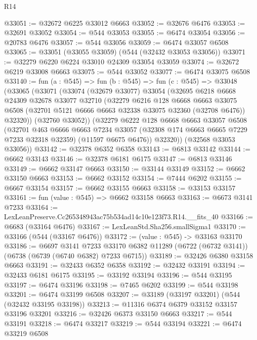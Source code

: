 \begin{lexlean}{R14}
\begin{coremodule}
@33051 := @32672 @6225 @33012 @6663
@33052 := @32676 @6476
@33053 := @32691 @33052
@33054 := @544 @33053
@33055 := @6474 @33054
@33056 := @20783 @6476
@33057 := @544 @33056
@33059 := @6474 @33057 @6508
@33065 := @33051 (@33055 @33059) (@544 (@32432 @33053 @33056))
@33071 := @32279 @6220 @6224 @33010 @24309 @33054 @33059
@33074 := @32672 @6219 @33008 @6663
@33075 := @544 @33052
@33077 := @6474 @33075 @6508
@33140 := fun (a : @545) =>
  fun (b : @545) =>
  fun (c : @545) =>
  @33048
    (@33065
      (@33071
        (@33074
          (@32679 @33077)
          @33054
          (@32695
            @6218
            @6668
            @24309
            @32678
            @33077
            @32710
            (@32279
              @6216
              @128
              @6668
              @6663
              @33075
              @6508
              (@32701 @5121 @6666 @6663 @32338 @33075 @32360 (@32708 @6476))
              @32320))
          (@32760 @33052))
        (@32279
          @6222
          @128
          @6668
          @6663
          @33057
          @6508
          (@32701
            @463
            @6666
            @6663
            @7234
            @33057
            (@32308 @174 @6663 @6665 @7229 @7233 @32318 @32359)
            (@11597 @6675 @6476))
          @32320))
      (@32568 @33053 @33056))
@33142 := @32378 @6352 @6358
@33143 := @6813 @33142
@33144 := @6662 @33143
@33146 := @32378 @6181 @6175
@33147 := @6813 @33146
@33149 := @6662 @33147 @6663
@33150 := @33144 @33149
@33152 := @6662 @33150 @6663
@33153 := @6662 @33152
@33154 := @7444 @6202
@33155 := @6667 @33154
@33157 := @6662 @33155 @6663
@33158 := @33153 @33157
@33161 := fun (value : @545) => @6662 @33158 @6663
@33163 := @6673 @3141 @7233
@33164 := LexLeanPreserve.Cc265348943ac75b534ad14c10e123f73.R14.__fits_40
@33166 := @6683 (@33164 @6476)
@33167 := LexLeanStd.Sha256.smallSigma1
@33170 := @33166 (@544 (@33167 @6476))
@33172 := (value : @545) -> @33163 @33170
@33186 := @6697
    @3141
    @7233
    @33170
    @6382
    @11289
    (@6722 (@6732 @3141))
    (@6738 (@6739 (@6740 @6382) @7233 @6715))
@33189 := @32426 @6380 @33158 @6663
@33191 := @32433 @6352 @6358
@33192 := @32432 @33191
@33194 := @32433 @6181 @6175
@33195 := @33192 @33194
@33196 := @544 @33195
@33197 := @6474 @33196
@33198 := @7465 @6202
@33199 := @544 @33198
@33201 := @6474 @33199 @6508
@33207 := @33189 (@33197 @33201) (@544 (@32432 @33195 @33198))
@33213 := @11316 @6374 @6379 @33152 @33157 @33196 @33201
@33216 := @32426 @6373 @33150 @6663
@33217 := @544 @33191
@33218 := @6474 @33217
@33219 := @544 @33194
@33221 := @6474 @33219 @6508

\end{coremodule}
\end{lexlean}
